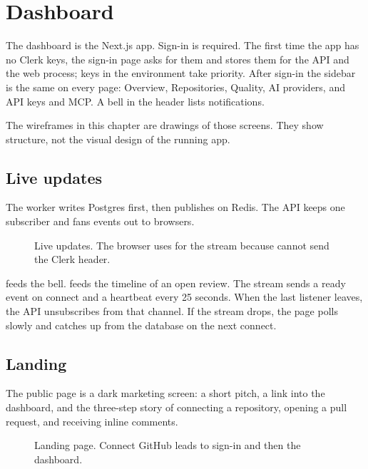 \chapter{Dashboard}
\label{chap:dashboard}

The dashboard is the Next.js app. Sign-in is required. The first time the app has no Clerk keys, the sign-in page asks for them and stores them for the API and the web process; keys in the environment take priority. After sign-in the sidebar is the same on every page: Overview, Repositories, Quality, AI providers, and API keys and MCP. A bell in the header lists notifications.

The wireframes in this chapter are drawings of those screens. They show structure, not the visual design of the running app.

\section{Live updates}

The worker writes Postgres first, then publishes on Redis. The API keeps one subscriber and fans events out to browsers.

\begin{figure}[H]
  \centering
  \resizebox{\linewidth}{!}{}
  \caption{Live updates. The browser uses  for the stream because  cannot send the Clerk  header.}
  \label{fig:realtime}
\end{figure}

 feeds the bell.  feeds the timeline of an open review. The stream sends a ready event on connect and a heartbeat every 25 seconds. When the last listener leaves, the API unsubscribes from that channel. If the stream drops, the page polls slowly and catches up from the database on the next connect.

\section{Landing}

The public page is a dark marketing screen: a short pitch, a link into the dashboard, and the three-step story of connecting a repository, opening a pull request, and receiving inline comments.

\begin{figure}[H]
  \centering
  \resizebox{0.92\linewidth}{!}{}
  \caption{Landing page. Connect GitHub leads to sign-in and then the dashboard.}
  \label{fig:mock-landing}
\end{figure}

